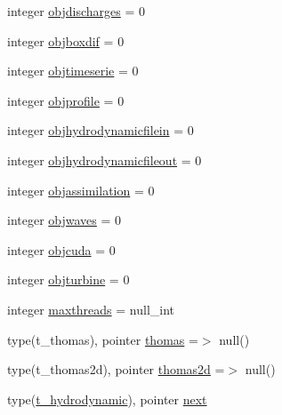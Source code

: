 \begin{DoxyCompactItemize}
\item 
integer \mbox{\hyperlink{structmodulehydrodynamic_1_1t__hydrodynamic_afe9a86901067ecd82467c890431194c6}{objdischarges}} = 0
\item 
integer \mbox{\hyperlink{structmodulehydrodynamic_1_1t__hydrodynamic_a4718c7582a9165037f38df4afa4e2879}{objboxdif}} = 0
\item 
integer \mbox{\hyperlink{structmodulehydrodynamic_1_1t__hydrodynamic_a975595903a4be83df82dd9f08daf8c94}{objtimeserie}} = 0
\item 
integer \mbox{\hyperlink{structmodulehydrodynamic_1_1t__hydrodynamic_ae887137c01c9c714da6d3689ab0c8d45}{objprofile}} = 0
\item 
integer \mbox{\hyperlink{structmodulehydrodynamic_1_1t__hydrodynamic_ad22451a84492195b3ede67a0b76df248}{objhydrodynamicfilein}} = 0
\item 
integer \mbox{\hyperlink{structmodulehydrodynamic_1_1t__hydrodynamic_a2cd352fb4929eebfe682358b5d04ede6}{objhydrodynamicfileout}} = 0
\item 
integer \mbox{\hyperlink{structmodulehydrodynamic_1_1t__hydrodynamic_a7fb2810e0cbc0263f38626585aab278b}{objassimilation}} = 0
\item 
integer \mbox{\hyperlink{structmodulehydrodynamic_1_1t__hydrodynamic_a69e305df94f5cb7fd1e8d66890ca4237}{objwaves}} = 0
\item 
integer \mbox{\hyperlink{structmodulehydrodynamic_1_1t__hydrodynamic_ac8ef2f4ea1625ba9233674876fb16fdc}{objcuda}} = 0
\item 
integer \mbox{\hyperlink{structmodulehydrodynamic_1_1t__hydrodynamic_a0c7914c69e99e724965ec2e2873d45e7}{objturbine}} = 0
\item 
integer \mbox{\hyperlink{structmodulehydrodynamic_1_1t__hydrodynamic_a076045ef33d7b77bc1f0666ddca91da8}{maxthreads}} = null\+\_\+int
\item 
type(t\+\_\+thomas), pointer \mbox{\hyperlink{structmodulehydrodynamic_1_1t__hydrodynamic_a6208c707e3fcf1d36bd9f881cfc27632}{thomas}} =$>$ null()
\item 
type(t\+\_\+thomas2d), pointer \mbox{\hyperlink{structmodulehydrodynamic_1_1t__hydrodynamic_aa6213632d5a12ef5b5eb58e933a533f8}{thomas2d}} =$>$ null()
\item 
type(\mbox{\hyperlink{structmodulehydrodynamic_1_1t__hydrodynamic}{t\+\_\+hydrodynamic}}), pointer \mbox{\hyperlink{structmodulehydrodynamic_1_1t__hydrodynamic_a9242d809c5945beed8f5abb7e62dd0c1}{next}}
\end{DoxyCompactItemize}


